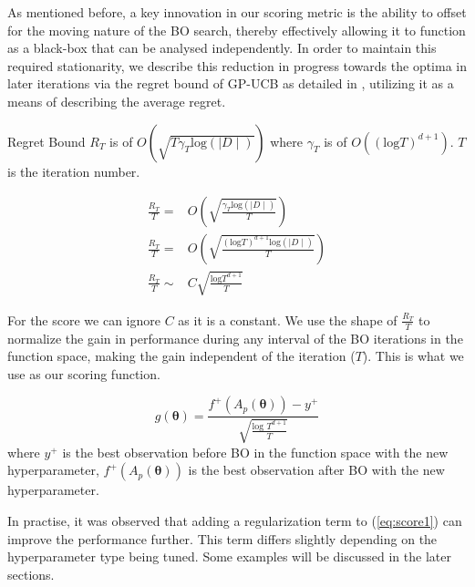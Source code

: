 As mentioned before, a key innovation in our scoring metric is the ability to offset for the moving nature of the BO search, thereby effectively allowing it to function as a black-box that can be analysed independently. In order to maintain this required stationarity, we describe this reduction in progress towards the optima in later iterations via the regret bound of GP-UCB as detailed in \cite{Srinivas:2010:GPO:3104322.3104451}, utilizing it as a means of describing the average regret. 

Regret Bound $R_{T}$ is of $O(\sqrt{T\gamma_{T}\text{log}(\mid D \mid)})$ where $\gamma_{T}$ is of $O((\text{log} T)^{d+1})$. $T$ is the iteration number.

\begin{align*}
\frac{R_{T}}{T} = & O\left(\sqrt{\frac{\gamma_{T} \text{log}(\mid D \mid)}{T}} \right)\\
\frac{R_{T}}{T} = & O\left(\sqrt{\frac{(\text{log} T)^{d+1} \text{log}(\mid D \mid)}{T}} \right)\\
\frac{R_{T}}{T} \sim & C\sqrt{\frac{\text{log} T^{d+1}}{T}}
\end{align*}

For the score we can ignore $C$ as it is a constant. We use the shape of $\frac{R_{T}}{T}$ to normalize the gain in performance during any interval of the BO iterations in the function space, making the gain independent of the iteration ($T$). This is what we use as our scoring function.

\begin{equation}\label{eq:score1}
g(\boldsymbol{\theta}) = \frac{f^{+}(A_{p}(\boldsymbol{\theta}))-y^{+}}{\sqrt{\frac{\text{log } T^{d+1}}{T}}}
\end{equation}
where $y^{+}$ is the best observation before BO in the function space with the new hyperparameter, $f^{+}(A_{p}(\boldsymbol{\theta}))$ is the best observation after BO with the new hyperparameter.

In practise, it was observed that adding a regularization term to (\ref{eq:score1}) can improve the performance further. This term differs slightly depending on the hyperparameter type being tuned. Some examples will be discussed in the later sections.